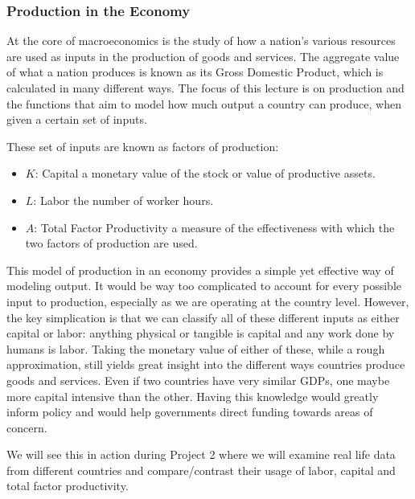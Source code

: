 \documentclass[letterpaper,10pt,english]{jupyterBook}
\begin{document}
\subsubsection{Production in the Economy}
\label{\detokenize{content/04-production/production:production-in-the-economy}}
\sphinxAtStartPar
At the core of macroeconomics is the study of how a nation’s various resources are used as inputs in the production of goods and services. The aggregate value of what a nation produces is known as its Gross Domestic Product, which is calculated in many different ways. The focus of this lecture is on production and the functions that aim to model how much output a country can produce, when given a certain set of inputs.

\sphinxAtStartPar
These set of inputs are known as factors of production:
\begin{itemize}
\item {} 
\sphinxAtStartPar
\(K\): Capital \sphinxhyphen{} a monetary value of the stock or value of productive assets.

\item {} 
\sphinxAtStartPar
\(L\): Labor \sphinxhyphen{} the number of worker hours.

\item {} 
\sphinxAtStartPar
\(A\): Total Factor Productivity \sphinxhyphen{} a measure of the effectiveness with which the two factors of production are used.

\end{itemize}

\sphinxAtStartPar
This model of production in an economy provides a simple yet effective way of modeling output. It would be way too complicated to account for every possible input to production, especially as we are operating at the country level. However, the key simplication is that we can classify all of these different inputs as either capital or labor: anything physical or tangible is capital and any work done by humans is labor. Taking the monetary value of either of these, while a rough approximation, still yields great insight into the different ways countries produce goods and services. Even if two countries have very similar GDPs, one maybe more capital intensive than the other. Having this knowledge would greatly inform policy and would help governments direct funding towards areas of concern.

\sphinxAtStartPar
We will see this in action during Project 2 where we will examine real life data from different countries and compare/contrast their usage of labor, capital and total factor productivity.
\end{document}
